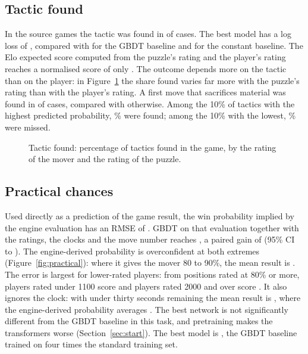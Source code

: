 \documentclass[11pt]{article}
\begin{document}
\subsection{Tactic found}

In the source games the tactic was found in
 of cases. The best model has a log loss of
, compared with 
for the GBDT baseline and  for the constant
baseline. The Elo expected score computed from the puzzle's rating and the
player's rating reaches a normalised score of only
. The outcome depends more on
the tactic than on the player: in Figure~\ref{fig:tactic} the share found
varies far more with the puzzle's rating than with the player's rating. A
first move that sacrifices material was found in
 of cases, compared with
 otherwise. Among the 10\% of
tactics with the highest predicted probability,
\% were found; among the 10\% with the
lowest, \% were missed.

\begin{figure}[htbp]\centering
{}
\caption{Tactic found: percentage of tactics found in the game, by the
rating of the mover and the rating of the puzzle.}
\label{fig:tactic}
\end{figure}

\subsection{Practical chances}

Used directly as a prediction of the game result, the win probability
implied by the engine evaluation has an RMSE of
. GBDT on that evaluation
together with the ratings, the clocks and the move number reaches
, a paired gain of
 (95\% CI
 to
). The
engine-derived probability is overconfident at both extremes
(Figure~\ref{fig:practical}): where it gives the mover 80 to 90\%,
the mean result is . The error
is largest for lower-rated players: from positions rated at 80\% or more,
players rated under 1100 score
 and players rated
2000 and over score
. It also ignores
the clock: with under thirty seconds remaining the mean result is
, where the engine-derived
probability averages
. The best network
is not significantly different from the GBDT baseline in this task, and
pretraining makes the transformers worse (Section~\ref{sec:start}). The best
model is , the GBDT baseline trained on four
times the standard training set.
\end{document}
